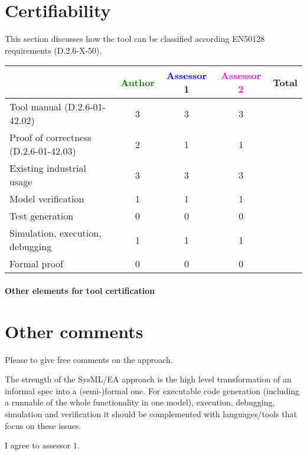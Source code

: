 \section{Certifiability}

This section discusses how the tool can be classified according EN50128 requirements (D.2.6-X-50).


\begin{tabular}{|l | c | c | c | c|}
\hline
& \textcolor{green}{Author} & \textcolor{blue}{Assessor 1} & \textcolor{magenta}{Assessor 2} & Total \\
\hline 
Tool manual (D.2.6-01-42.02) &3 & 3&3 &  \\
\hline
Proof of correctness (D.2.6-01-42.03)   &2 & 1& 1& \\
\hline
Existing industrial  usage  &3 & 3&3 & \\
\hline
Model verification &1 & 1& 1& \\
\hline
Test generation &0 & 0& 0& \\
\hline
Simulation, execution, debugging &1 & 1&1 & \\
\hline
Formal proof &0 & 0& 0& \\
\hline
\end{tabular}

\paragraph{Other elements for tool certification}

\section{Other comments}
Please to  give free comments on the approach.

\begin{assessor1}
The strength of the SysML/EA approach is the high level transformation of an informal spec into a (semi-)formal one. 
For executable code generation (including a runnable of the whole functionality in one model), execution, debugging, simulation and verification it should be complemented with languages/tools that focus on these issues.
\end{assessor1}

\begin{assessor2}
I agree to assessor 1.
\end{assessor2}


